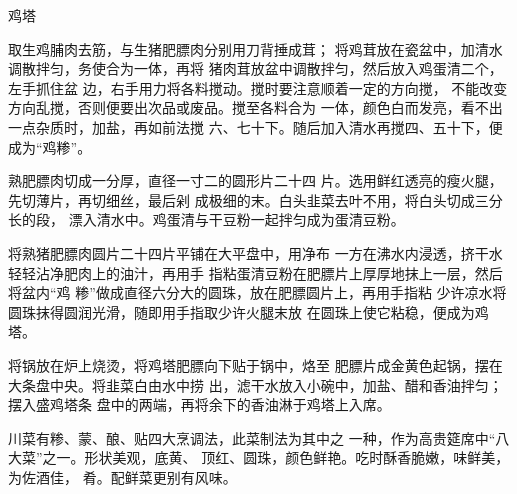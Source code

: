\begin{recipe}[金钱鸡塔]{鸡塔}

\ingredients


\cooking

\step 取生鸡脯肉去筋，与生猪肥膘肉分别用刀背捶成茸； 将鸡茸放在瓷盆中，加清水调散拌匀，务使合为一体，再将 猪肉茸放盆中调散拌匀，然后放入鸡蛋清二个，左手抓住盆 边，右手用力将各料搅动。搅时要注意顺着一定的方向搅， 不能改变方向乱搅，否则便要出次品或废品。搅至各料合为 一体，颜色白而发亮，看不出一点杂质时，加盐，再如前法搅 六、七十下。随后加入清水再搅四、五十下，便成为“鸡糁”。

\step 熟肥膘肉切成一分厚，直径一寸二的圆形片二十四 片。选用鲜红透亮的瘦火腿，先切薄片，再切细丝，最后剁 成极细的末。白头韭菜去叶不用，将白头切成三分长的段， 漂入清水中。鸡蛋清与干豆粉一起拌匀成为蛋清豆粉。

\step 将熟猪肥膘肉圆片二十四片平铺在大平盘中，用净布 一方在沸水内浸透，挤干水轻轻沾净肥肉上的油汁，再用手 指粘蛋清豆粉在肥膘片上厚厚地抹上一层，然后将盆内“鸡 糁”做成直径六分大的圆珠，放在肥膘圆片上，再用手指粘 少许凉水将圆珠抹得圆润光滑，随即用手指取少许火腿末放 在圆珠上使它粘稳，便成为鸡塔。

\step 将锅放在炉上烧烫，将鸡塔肥膘向下贴于锅中，烙至 肥膘片成金黄色起锅，摆在大条盘中央。将韭菜白由水中捞 出，滤干水放入小碗中，加盐、醋和香油拌匀；摆入盛鸡塔条 盘中的两端，再将余下的香油淋于鸡塔上入席。

\notes

川菜有糁、蒙、酿、贴四大烹调法，此菜制法为其中之 一种，作为高贵筵席中“八大菜”之一。形状美观，底黄、 顶红、圆珠，颜色鲜艳。吃时酥香脆嫩，味鲜美，为佐酒佳， 肴。配鲜菜更别有风味。

\end{recipe}

